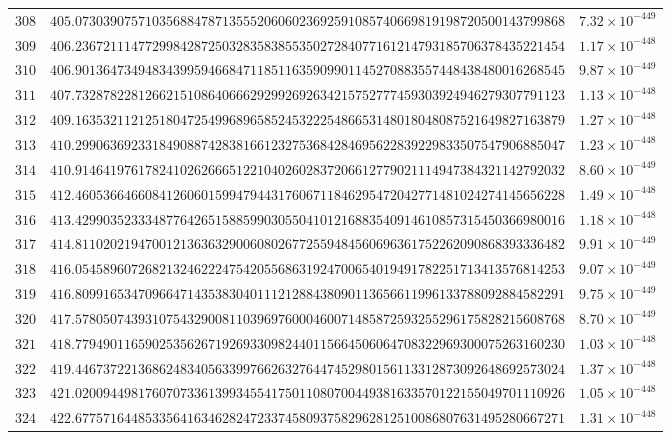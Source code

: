 \documentclass[12pt,reqno]{amsart}
\theoremstyle{remark}
\begin{document}
\begin{longtable}{clc}
$308$ & $405.0730390757103568847871355520606023692591085740669819198720500143799868$ & $7.32\times 10^{-449}$ \\
$309$ & $406.2367211147729984287250328358385535027284077161214793185706378435221454$ & $1.17\times 10^{-448}$ \\
$310$ & $406.9013647349483439959466847118511635909901145270883557448438480016268545$ & $9.87\times 10^{-449}$ \\
$311$ & $407.7328782281266215108640666292992692634215752777459303924946279307791123$ & $1.13\times 10^{-448}$ \\
$312$ & $409.1635321121251804725499689658524532225486653148018048087521649827163879$ & $1.27\times 10^{-448}$ \\
$313$ & $410.2990636923318490887428381661232753684284695622839229833507547906885047$ & $1.23\times 10^{-448}$ \\
$314$ & $410.9146419761782410262666512210402602837206612779021114947384321142792032$ & $8.60\times 10^{-449}$ \\
$315$ & $412.4605366466084126060159947944317606711846295472042771481024274145656228$ & $1.49\times 10^{-448}$ \\
$316$ & $413.4299035233348776426515885990305504101216883540914610857315450366980016$ & $1.18\times 10^{-448}$ \\
$317$ & $414.8110202194700121363632900608026772559484560696361752262090868393336482$ & $9.91\times 10^{-449}$ \\
$318$ & $416.0545896072682132462224754205568631924700654019491782251713413576814253$ & $9.07\times 10^{-449}$ \\
$319$ & $416.8099165347096647143538304011121288438090113656611996133788092884582291$ & $9.75\times 10^{-449}$ \\
$320$ & $417.5780507439310754329008110396976000460071485872593255296175828215608768$ & $8.70\times 10^{-449}$ \\
$321$ & $418.7794901165902535626719269330982440115664506064708322969300075263160230$ & $1.03\times 10^{-448}$ \\
$322$ & $419.4467372213686248340563399766263276447452980156113312873092648692573024$ & $1.37\times 10^{-448}$ \\
$323$ & $421.0200944981760707336139934554175011080700449381633570122155049701110926$ & $1.05\times 10^{-448}$ \\
$324$ & $422.6775716448533564163462824723374580937582962812510086807631495280667271$ & $1.31\times 10^{-448}$ \\

\end{longtable}
\end{document}
